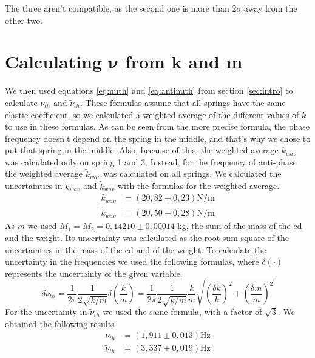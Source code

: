 \documentclass{article}
\begin{document}
The three aren't compatible, as the second one is more than $2 \sigma$ away from the other two. 

\section{Calculating $\bm \nu$ from k and m} \label{sec:nukm}

We then used equations \ref{eq:nuth} and \ref{eq:antinuth} from section \ref{sec:intro} to calculate $\nu_{th}$
and $\tilde \nu_{th}$. These formulas assume that all springs have
the same elastic coefficient, so we calculated a weighted average of
the different values of $k$ to use in these formulas. As can be seen from the more precise formula, the phase
frequency doesn't depend on the spring in the middle, and that's why we chose to put that spring in the middle. Also, because of this, the weighted average $k_{wav}$ was calculated only on spring 1 and 3.
Instead, for the frequency of anti-phase the weighted average 
$\tilde k_{wav}$ was calculated on all springs. We calculated the uncertainties in $k_{wav}$ and $\tilde k_{wav}$ with the formulas for the weighted average. 
\begin{align}
           k_{wav} &= (20,82 \pm 0,23) \text{N/m} \\
    \tilde k_{wav} &= (20,50 \pm 0,28) \text{N/m}
\end{align}
As $m$ we used $M_1=M_2=0,14210 \pm 0,00014$ kg, the sum of the mass of the cd and the weight. Its uncertainty was calculated as the root-sum-square of the uncertainties in the mass of the cd and of the weight.
To calculate the uncertainty in the frequencies we used the following formulas, where $\delta(\cdot)$ represents the uncertainty of the given variable.
\begin{equation} \label{eq:inc_nuth}
    \delta \nu_{th}
    = \frac{1}{2\pi} \frac{1}{2\sqrt{k/m}} \delta \left ( \frac{k}{m} \right )
    = \frac{1}{2\pi} \frac{1}{2\sqrt{k/m}}  \frac{k}{m} \sqrt{ \left ( \frac{ \delta k}{k}  \right ) ^2 +
           \left ( \frac{ \delta m}{m}  \right ) ^2}
\end{equation}
For the uncertainty in $\tilde \nu_{th}$ we used the same formula, with a factor of $\sqrt 3$. We obtained the following results
\begin{align}
           \nu_{th} &= (1,911 \pm 0,013) \text{Hz}\\
    \tilde \nu_{th} &= (3,337 \pm 0,019) \text{Hz}
\end{align}
\end{document}
